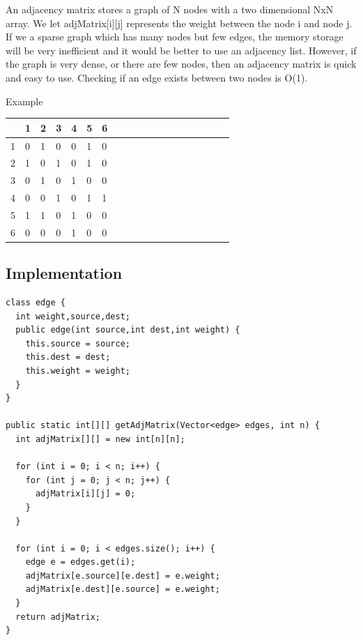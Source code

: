 \documentclass[11pt,oneside]{book}
\begin{document}
An adjacency matrix stores a graph of N nodes with a two dimensional NxN array. We let adjMatrix[i][j] represents the weight between the node i and node j. If we a sparse graph which has many nodes but few edges, the memory storage will be very inefficient and it would be better to use an adjacency list. However, if the graph is very dense, or there are few nodes, then an adjacency matrix is quick and easy to use. Checking if an edge exists between two nodes is O(1).

Example

\vspace{10px}\begin{tabulary}{0.4\linewidth}{|l|l|l|l|l|l|l|l|l|l|l|l|l|l|l|l|l|l|l}\hline


   &
  1 &
  2 &
  3 &
  4 &
  5 &
  6\\
\hline


  1 &
  0 &
  1 &
  0 &
  0 &
  1 &
  0\\

  2 &
  1 &
  0 &
  1 &
  0 &
  1 &
  0\\

  3 &
  0 &
  1 &
  0 &
  1 &
  0 &
  0\\

  4 &
  0 &
  0 &
  1 &
  0 &
  1 &
  1\\

  5 &
  1 &
  1 &
  0 &
  1 &
  0 &
  0\\

  6 &
  0 &
  0 &
  0 &
  1 &
  0 &
  0\\

\hline\end{tabulary}

\subsection{Implementation}

\begin{lstlisting}
class edge {
  int weight,source,dest;
  public edge(int source,int dest,int weight) {
    this.source = source;
    this.dest = dest;
    this.weight = weight;
  }
}

public static int[][] getAdjMatrix(Vector<edge> edges, int n) {
  int adjMatrix[][] = new int[n][n];

  for (int i = 0; i < n; i++) {
    for (int j = 0; j < n; j++) {
      adjMatrix[i][j] = 0;
    }
  }

  for (int i = 0; i < edges.size(); i++) {
    edge e = edges.get(i);
    adjMatrix[e.source][e.dest] = e.weight;
    adjMatrix[e.dest][e.source] = e.weight;
  }
  return adjMatrix;
}
\end{lstlisting}
\end{document}
